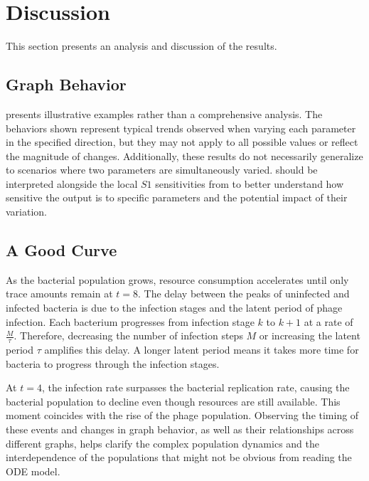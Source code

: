 \chapter{Discussion}
\label{Discussion}
This section presents an analysis and discussion of the results. 

\section{Graph Behavior}
 presents illustrative examples rather than a comprehensive analysis. 
The behaviors shown represent typical trends observed when varying each parameter in the specified direction, but they may not apply to all possible values or reflect the magnitude of changes. 
Additionally, these results do not necessarily generalize to scenarios where two parameters are simultaneously varied. 
 should be interpreted alongside the local $S1$ sensitivities from  to better understand how sensitive the output is to specific parameters and the potential impact of their variation.

\section{A Good Curve}
As the bacterial population grows, resource consumption accelerates until only trace amounts remain at $t=8$. 
The delay between the peaks of uninfected and infected bacteria is due to the infection stages and the latent period of phage infection. 
Each bacterium progresses from infection stage $k$ to $k+1$ at a rate of $\frac{M}{\tau}$. 
Therefore, decreasing the number of infection steps $M$ or increasing the latent period $\tau$ amplifies this delay. 
A longer latent period means it takes more time for bacteria to progress through the infection stages.

At $t=4$, the infection rate surpasses the bacterial replication rate, causing the bacterial population to decline even though resources are still available. 
This moment coincides with the rise of the phage population. 
Observing the timing of these events and changes in graph behavior, as well as their relationships across different graphs, helps clarify the complex population dynamics and the interdependence of the populations that might not be obvious from reading the ODE model. 


